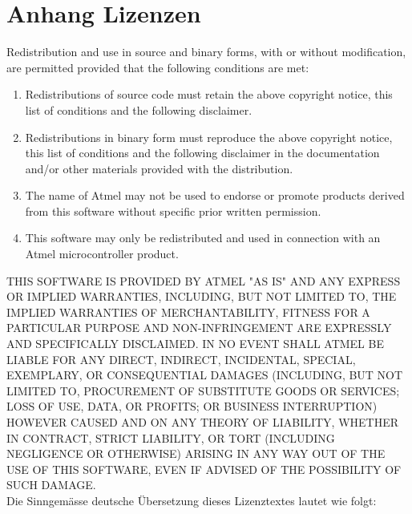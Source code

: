 \clearpage
\section{Anhang Lizenzen}\label{sec:appendix_lizenzen}
Redistribution and use in source and binary forms, with or without modification, are permitted provided that the following conditions are met:
\begin{enumerate}
	\item Redistributions of source code must retain the above copyright notice, this list of conditions and the following disclaimer.
	\item Redistributions in binary form must reproduce the above copyright notice, this list of conditions and the following disclaimer in the documentation and/or other materials provided with the distribution.
	\item The name of Atmel may not be used to endorse or promote products derived from this software without specific prior written permission.
	\item This software may only be redistributed and used in connection with an Atmel microcontroller product.
\end{enumerate}

THIS SOFTWARE IS PROVIDED BY ATMEL "AS IS" AND ANY EXPRESS OR IMPLIED WARRANTIES, INCLUDING, BUT NOT LIMITED TO, THE IMPLIED WARRANTIES OF MERCHANTABILITY, FITNESS FOR A PARTICULAR PURPOSE AND NON-INFRINGEMENT ARE EXPRESSLY AND SPECIFICALLY DISCLAIMED. IN NO EVENT SHALL ATMEL BE LIABLE FOR ANY DIRECT, INDIRECT, INCIDENTAL, SPECIAL, EXEMPLARY, OR CONSEQUENTIAL DAMAGES (INCLUDING, BUT NOT LIMITED TO, PROCUREMENT OF SUBSTITUTE GOODS OR SERVICES; LOSS OF USE, DATA, OR PROFITS; OR BUSINESS INTERRUPTION) HOWEVER CAUSED AND ON ANY THEORY OF LIABILITY, WHETHER IN CONTRACT, STRICT LIABILITY, OR TORT (INCLUDING NEGLIGENCE OR OTHERWISE) ARISING IN ANY WAY OUT OF THE USE OF THIS SOFTWARE, EVEN IF ADVISED OF THE POSSIBILITY OF SUCH DAMAGE.\\


Die Sinngemässe deutsche Übersetzung dieses Lizenztextes lautet wie folgt:\\

